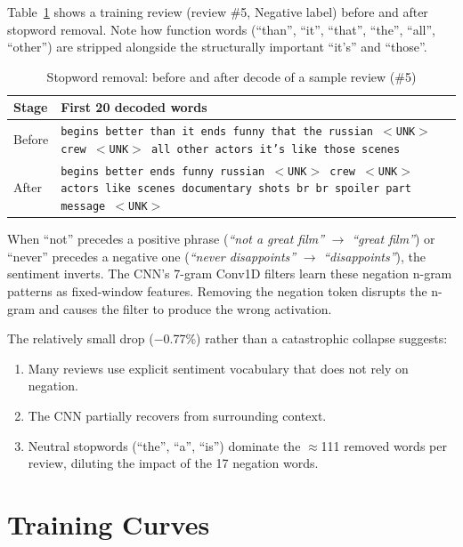 \documentclass[12pt,a4paper]{article}
\begin{document}
Table~\ref{tab:decode} shows a training review (review \#5, Negative label) before
and after stopword removal. Note how function words (``than'', ``it'', ``that'',
``the'', ``all'', ``other'') are stripped alongside the structurally important
``it's'' and ``those''.

\begin{table}[H]
  \centering
  \caption{Stopword removal: before and after decode of a sample review (\#5)}
  \label{tab:decode}
  \begin{tabular}{p{1.5cm} p{11cm}}
    \toprule
    \textbf{Stage} & \textbf{First 20 decoded words} \\
    \midrule
    Before &
      \texttt{begins better than it ends funny that the russian $<$UNK$>$ crew
      $<$UNK$>$ all other actors it's like those scenes} \\
    \addlinespace
    After &
      \texttt{begins better ends funny russian $<$UNK$>$ crew $<$UNK$>$ actors
      like scenes documentary shots br br spoiler part message $<$UNK$>$} \\
    \bottomrule
  \end{tabular}
\end{table}

When ``not'' precedes a positive phrase (\textit{``not a great film''} $\to$
\textit{``great film''}) or ``never'' precedes a negative one (\textit{``never
disappoints''} $\to$ \textit{``disappoints''}), the sentiment inverts. The CNN's 7-gram
Conv1D filters learn these negation n-gram patterns as fixed-window features. Removing
the negation token disrupts the n-gram and causes the filter to produce the wrong
activation.

The relatively small drop ($-$0.77\%) rather than a catastrophic collapse suggests:
\begin{enumerate}
  \item Many reviews use explicit sentiment vocabulary that does not rely on negation.
  \item The CNN partially recovers from surrounding context.
  \item Neutral stopwords (``the'', ``a'', ``is'') dominate the $\approx$111 removed
        words per review, diluting the impact of the 17 negation words.
\end{enumerate}

\section{Training Curves}
\end{document}
